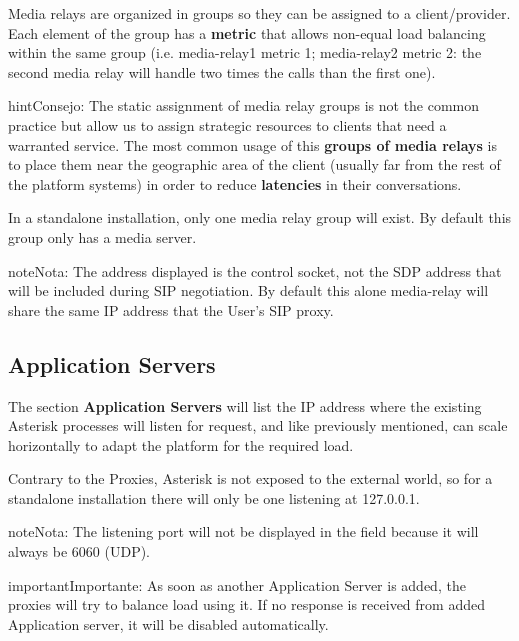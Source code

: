 \documentclass[letterpaper,10pt,spanish]{sphinxmanual}
\begin{document}
Media relays are organized in groups so they can be assigned to a client/provider. Each
element of the group has a \textbf{metric} that allows non-equal load balancing
within the same group (i.e. media-relay1 metric 1; media-relay2 metric 2:
the second media relay will handle two times the calls than the first one).

\begin{notice}{hint}{Consejo:}
The static assignment of media relay groups is not the common practice
but allow us to assign strategic resources to clients that need a warranted
service. The most common usage of this \textbf{groups of media relays} is to
place them near the geographic area of the client (usually far from the
rest of the platform systems) in order to reduce \textbf{latencies} in their
conversations.
\end{notice}

In a standalone installation, only one media relay group will exist. By default this group only has a media server.

\begin{notice}{note}{Nota:}
The address displayed is the control socket, not the SDP address that
will be included during SIP negotiation. By default this alone media-relay
will share the same IP address that the User's SIP proxy.
\end{notice}


\subsection{Application Servers}
\label{administration_portal/platform/infrastructure/application_servers::doc}\label{administration_portal/platform/infrastructure/application_servers:application-servers}
The section \textbf{Application Servers} will list the IP address where the existing
Asterisk processes will listen for request, and like previously mentioned,
can scale horizontally to adapt the platform for the required load.

Contrary to the Proxies, Asterisk is not exposed to the external world, so
for a standalone installation there will only be one listening at 127.0.0.1.

\begin{notice}{note}{Nota:}
The listening port will not be displayed in the field because it will
always be 6060 (UDP).
\end{notice}

\begin{notice}{important}{Importante:}
As soon as another Application Server is added, the proxies will
try to balance load using it. If no response is received from added
Application server, it will be disabled automatically.
\end{notice}
\end{document}
